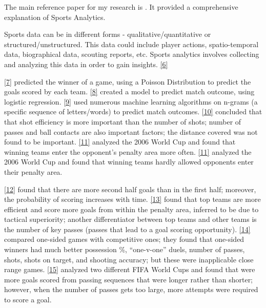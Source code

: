 \documentclass[
  english,
  doc,floatsintext]{apa6}
\begin{document}
The main reference paper for my research is . It provided a comprehensive explanation of Sports Analytics.

Sports data can be in different forms - qualitative/quantitative or structured/unstructured. This data could include player actions, spatio-temporal data, biographical data, scouting reports, etc. Sports analytics involves collecting and analyzing this data in order to gain insights. \protect\hyperlink{ref-bhatnagarSystematicReviewSports2019}{{[}6{]}}

\protect\hyperlink{ref-dixonModellingAssociationFootball1997}{{[}7{]}} predicted the winner of a game, using a Poisson Distribution to predict the goals scored by each team. \protect\hyperlink{ref-maoIdentifyingKeysWin2016}{{[}8{]}} created a model to predict match outcome, using logistic regression. \protect\hyperlink{ref-kampakisUsingTwitterPredict}{{[}9{]}} used numerous machine learning algorithms on n-grams (a specific sequence of letters/words) to predict match outcomes. \protect\hyperlink{ref-broichStatisticalAnalysisFirst2014}{{[}10{]}} concluded that that shot efficiency is more important than the number of shots; number of passes and ball contacts are also important factors; the distance covered was not found to be important. \protect\hyperlink{ref-ruiz-ruizAnalysisEntriesPenalty2013}{{[}11{]}} analyzed the 2006 World Cup and found that winning teams enter the opponent's penalty area more often. \protect\hyperlink{ref-ruiz-ruizAnalysisEntriesPenalty2013}{{[}11{]}} analyzed the 2006 World Cup and found that winning teams hardly allowed opponents enter their penalty area.

\protect\hyperlink{ref-armatasEVALUATIONGOALSSCORED2009}{{[}12{]}} found that there are more second half goals than in the first half; moreover, the probability of scoring increases with time. \protect\hyperlink{ref-DIFFERENCESOFFENSIVEACTIONS}{{[}13{]}} found that top teams are more efficient and score more goals from within the penalty area, inferred to be due to tactical superiority; another differentiator between top teams and other teams is the number of key passes (passes that lead to a goal scoring opportunity). \protect\hyperlink{ref-evangelosWinnersLosersTop}{{[}14{]}} compared one-sided games with competitive ones; they found that one-sided winners had much better possession \%, ``one-v-one'' duels, number of passes, shots, shots on target, and shooting accuracy; but these were inapplicable close range games. \protect\hyperlink{ref-hughesAnalysisPassingSequences2005}{{[}15{]}} analyzed two different FIFA World Cups and found that were more goals scored from passing sequences that were longer rather than shorter; however, when the number of passes gets too large, more attempts were required to score a goal.
\end{document}
